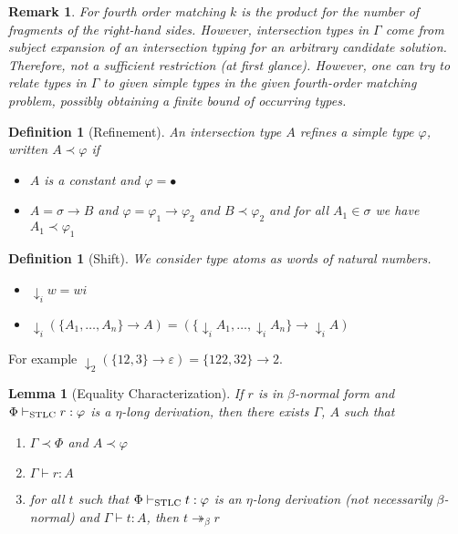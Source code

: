 \documentclass[10pt,a4paper]{article}
\theoremstyle{plain}%
\newtheorem{definition}[theorem]{Definition}
\newtheorem{lemma}[theorem]{Lemma}
\newtheorem{remark}[theorem]{Remark}
\begin{document}
\begin{remark}
For fourth order matching $k$ is the product for the number of fragments of the right-hand sides.
However, intersection types in $\Gamma$ come from subject expansion of an intersection typing for an arbitrary candidate solution.
Therefore, not a sufficient restriction (at first glance).
However, one can try to relate types in $\Gamma$ to given simple types in the given fourth-order matching problem, possibly obtaining a finite bound of occurring types.
\end{remark}

\begin{definition}[Refinement]
An intersection type $A$ refines a simple type $\varphi$, written $A \prec \varphi$ if
\begin{itemize}
\item $A$ is a constant and $\varphi = \bullet$
\item $A = \sigma \to B$ and $\varphi = \varphi_1 \to \varphi_2$ and $B \prec \varphi_2$ and for all $A_1 \in \sigma$ we have $A_1 \prec \varphi_1$ 
\end{itemize}
\end{definition}

\begin{definition}[Shift]
We consider type atoms as words of natural numbers.
\begin{itemize}
\item ${\downarrow_i}w = wi$
\item ${\downarrow_i}(\{A_1, \ldots, A_n\} \to A) = (\{{\downarrow_i}A_1, \ldots, {\downarrow_i}A_n\} \to {\downarrow_i}A)$
\end{itemize}
\end{definition}

For example ${\downarrow_2}(\{12, 3\} \to \varepsilon) = \{122, 32\} \to 2$.

\begin{lemma}[Equality Characterization]
If $r$ is in $\beta$-normal form and $\Phi \vdash_{\textnormal{STLC}} r : \varphi$ is a $\eta$-long derivation, then there exists $\Gamma$, $A$ such that
\begin{enumerate}
\item $\Gamma \prec \Phi$ and $A \prec \varphi$
\item $\Gamma \vdash r : A$
\item for all $t$ such that $\Phi \vdash_{\textnormal{STLC}} t : \varphi$ is an $\eta$-long derivation (not necessarily $\beta$-normal) and $\Gamma \vdash t : A$, then $t \twoheadrightarrow_\beta r$
\end{enumerate}
\end{lemma}
\end{document}
